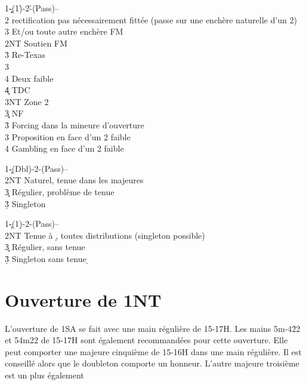 \documentclass[a4paper]{article}
\begin{document}
\begin{bidtable}
1\c\d-(1\h)-2\h-(Pass)--\\
2\s \> rectification pas nécessairement fittée (passe sur une enchère naturelle d'un 2\s )\+\\
3\s \> Et/ou toute autre enchère FM\-\\
2NT \> Soutien FM\+\\
3\h \> Re-Texas\+\\
3\s\+\\
4\s \> Deux faible\\
4\c \> TDC\\
3NT \> Zone 2\-\-\-\\
3\c\d \> NF\\
3\h \> Forcing dans la mineure d'ouverture\\
3\s \> Proposition en face d'un 2 faible\\
4\s \> Gambling en face d'un 2 faible
\end{bidtable}

\begin{bidtable}
1\c-(Dbl)-2\s-(Pass)--\\
2NT \> Naturel, tenue dans les majeures\\
3\c \> Régulier, problème de tenue\\
3\d\h\s \> Singleton
\end{bidtable}

\begin{bidtable}
1\c-(1\d)-2\s-(Pass)--\\
2NT \> Tenue à \d , toutes distributions (singleton possible)\\
3\c \> Régulier, sans tenue \d \\
3\d\h\s \> Singleton sans tenue \d 
\end{bidtable}

\section{Ouverture de 1NT}

L’ouverture de 1SA se fait avec une main régulière de 15-17H. 
Les mains 5m-4\h 22 et 54m22 de 15-17H sont également recommandées pour cette 
ouverture.
Elle peut comporter une majeure cinquième de 15-16H dans une main régulière. Il est 
conseillé alors que le doubleton comporte un honneur. L’autre majeure troisième est un plus 
également
\end{document}
